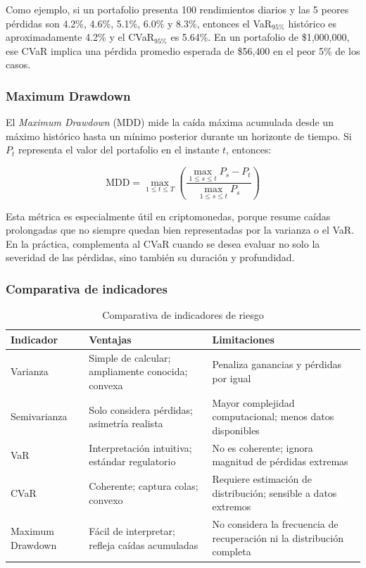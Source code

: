 \documentclass[12pt]{article}
\begin{document}
Como ejemplo, si un portafolio presenta 100 rendimientos diarios y las
5 peores pérdidas son 4.2\%, 4.6\%, 5.1\%, 6.0\% y 8.3\%, entonces el
VaR$_{95\%}$ histórico es aproximadamente 4.2\% y el CVaR$_{95\%}$ es
5.64\%. En un portafolio de \$1{,}000{,}000, ese CVaR implica una
pérdida promedio esperada de \$56{,}400 en el peor 5\% de los casos.

\subsubsection{Maximum Drawdown}

El \textit{Maximum Drawdown} (MDD) mide la caída máxima acumulada desde
un máximo histórico hasta un mínimo posterior durante un horizonte de
tiempo. Si $P_t$ representa el valor del portafolio en el instante $t$,
entonces:

\begin{equation}
  \mathrm{MDD} = \max_{1 \leq t \leq T}
  \left(
  \frac{\max_{1 \leq s \leq t} P_s - P_t}{\max_{1 \leq s \leq t} P_s}
  \right)
\end{equation}

Esta métrica es especialmente útil en criptomonedas, porque resume
caídas prolongadas que no siempre quedan bien representadas por la
varianza o el VaR. En la práctica, complementa al CVaR cuando se desea
evaluar no solo la severidad de las pérdidas, sino también su duración
y profundidad.

\subsubsection{Comparativa de indicadores}

\begin{table}[ht]
  \centering
  \caption{Comparativa de indicadores de riesgo}
  \label{tab:indicadores-riesgo}
  \begin{tabularx}{\textwidth}{lXX}
    \toprule
    \textbf{Indicador} & \textbf{Ventajas} & \textbf{Limitaciones} \\
    \midrule
    Varianza &
    Simple de calcular; ampliamente conocida; convexa &
    Penaliza ganancias y pérdidas por igual \\
    \addlinespace
    Semivarianza &
    Solo considera pérdidas; asimetría realista &
    Mayor complejidad computacional; menos datos disponibles \\
    \addlinespace
    VaR &
    Interpretación intuitiva; estándar regulatorio &
    No es coherente; ignora magnitud de pérdidas extremas \\
    \addlinespace
    CVaR &
    Coherente; captura colas; convexo &
    Requiere estimación de distribución; sensible a datos extremos \\
    \addlinespace
    Maximum Drawdown &
    Fácil de interpretar; refleja caídas acumuladas &
    No considera la frecuencia de recuperación ni la distribución completa \\
    \bottomrule
  \end{tabularx}
\end{table}
\end{document}
